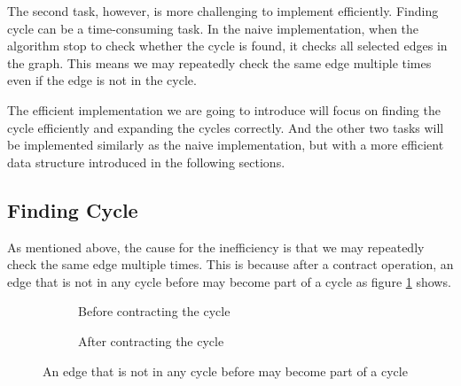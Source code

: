 \documentclass[a4paper,12pt]{article}
\begin{document}
The second task, however, is more challenging to implement efficiently.
Finding cycle can be a time-consuming task.
In the naive implementation, when the algorithm stop to check whether the cycle is found, it checks all selected edges in the graph.
This means we may repeatedly check the same edge multiple times even if the edge is not in the cycle.

The efficient implementation we are going to introduce will focus on finding the cycle efficiently and expanding the cycles correctly.
And the other two tasks will be implemented similarly as the naive implementation, but with a more efficient data structure introduced in the following sections.

\subsection*{Finding Cycle}

As mentioned above, the cause for the inefficiency is that we may repeatedly check the same edge multiple times.
This is because after a contract operation, an edge that is not in any cycle before may become part of a cycle as figure \ref{fig:cycle} shows.

\begin{figure}[H]
	\begin{subfigure}[t]{0.5\linewidth}
		\centering
		\caption{Before contracting the cycle}
	\end{subfigure}
	\begin{subfigure}[t]{0.5\linewidth}
		\centering
		\caption{After contracting the cycle}
	\end{subfigure}
	\caption{An edge that is not in any cycle before may become part of a cycle}
	\label{fig:cycle}
\end{figure}
\end{document}
